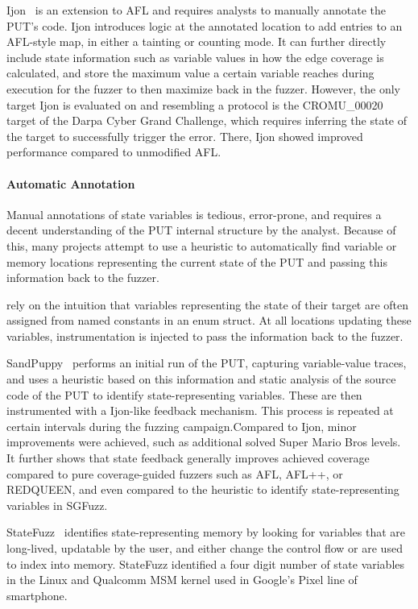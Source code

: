 \documentclass[twocolumn]{article}
\let\savedCite=\cite
\renewcommand{\cite}{\unskip~\savedCite}
\begin{document}
Ijon\cite{Ijon} is an extension to AFL and requires analysts to manually annotate the PUT's code. Ijon introduces logic at the annotated location to add entries to an AFL-style map, in either a tainting or counting mode. It can further directly include state information such as variable values in how the edge coverage is calculated, and store the maximum value a certain variable reaches during execution for the fuzzer to then maximize back in the fuzzer. However, the only target Ijon is evaluated on and resembling a protocol is the CROMU\_00020 target of the Darpa Cyber Grand Challenge, which requires inferring the state of the target to successfully trigger the error. There, Ijon showed improved performance compared to unmodified AFL.

\paragraph{Automatic Annotation}

Manual annotations of state variables is tedious, error-prone, and requires a decent understanding of the PUT internal structure by the analyst. Because of this, many projects attempt to use a heuristic to automatically find variable or memory locations representing the current state of the PUT and passing this information back to the fuzzer.

\citeauthor{SGFuzz} rely on the intuition that variables representing the state of their target are often assigned from named constants in an enum struct. At all locations updating these variables, instrumentation is injected to pass the information back to the fuzzer.\cite{SGFuzz}

SandPuppy\cite{SandPuppy} performs an initial run of the PUT, capturing variable-value traces, and uses a heuristic based on this information and static analysis of the source code of the PUT to identify state-representing variables. These are then instrumented with a Ijon-like feedback mechanism. This process is repeated at certain intervals during the fuzzing campaign.Compared to Ijon, minor improvements were achieved, such as additional solved Super Mario Bros levels. It further shows that state feedback generally improves achieved coverage compared to pure coverage-guided fuzzers such as AFL, AFL++, or REDQUEEN, and even compared to the heuristic to identify state-representing variables in SGFuzz.

StateFuzz\cite{StateFuzz} identifies state-representing memory by looking for variables that are long-lived, updatable by the user, and either change the control flow or are used to index into memory. StateFuzz identified a four digit number of state variables in the Linux and Qualcomm MSM kernel used in Google's Pixel line of smartphone.
\end{document}
